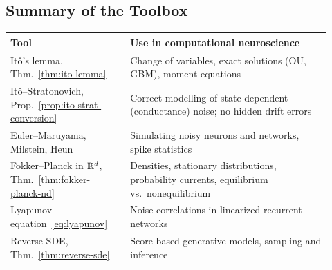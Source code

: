 \subsection*{Summary of the Toolbox}

\begin{center}
\begin{tabular}{@{}p{0.34\linewidth}p{0.58\linewidth}@{}}
\toprule
\textbf{Tool} & \textbf{Use in computational neuroscience} \\
\midrule
It\^o's lemma, Thm.~\ref{thm:ito-lemma} & Change of variables, exact solutions (OU, GBM), moment equations \\
It\^o--Stratonovich, Prop.~\ref{prop:ito-strat-conversion} & Correct modelling of state-dependent (conductance) noise; no hidden drift errors \\
Euler--Maruyama, Milstein, Heun & Simulating noisy neurons and networks, spike statistics \\
Fokker--Planck in $\mathbb{R}^d$, Thm.~\ref{thm:fokker-planck-nd} & Densities, stationary distributions, probability currents, equilibrium vs.\ nonequilibrium \\
Lyapunov equation~\eqref{eq:lyapunov} & Noise correlations in linearized recurrent networks \\
Reverse SDE, Thm.~\ref{thm:reverse-sde} & Score-based generative models, sampling and inference \\
\bottomrule
\end{tabular}
\end{center}